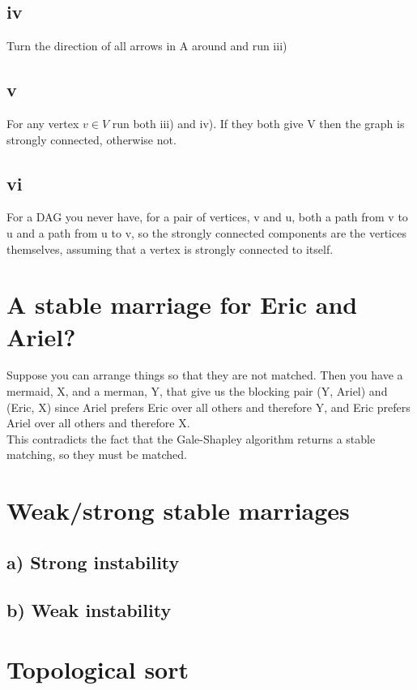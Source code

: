 \documentclass[a4paper]{article}
\begin{document}
\subsection*{iv}
Turn the direction of all arrows in A around and run iii)
\subsection*{v}
For any vertex $v \in V$ run both iii) and iv). If they both give V then the graph is strongly connected, otherwise not.
\subsection*{vi}
For a DAG you never have, for a pair of vertices, v and u, both a path from v to u and a path from u to v, so the strongly connected components are the vertices themselves, assuming that a vertex is strongly connected to itself.

\section{A stable marriage for Eric and Ariel?}
Suppose you can arrange things so that they are not matched. Then you have a mermaid, X, and a merman, Y, that give us the blocking pair (Y, Ariel) and (Eric, X) since Ariel prefers Eric over all others and therefore Y, and Eric prefers Ariel over all others and therefore X. \\
This contradicts the fact that the Gale-Shapley algorithm returns a stable matching, so they must be matched.

\section{Weak/strong stable marriages}
\subsection*{a) Strong instability}

\subsection*{b) Weak instability}

\section{Topological sort}
\end{document}
